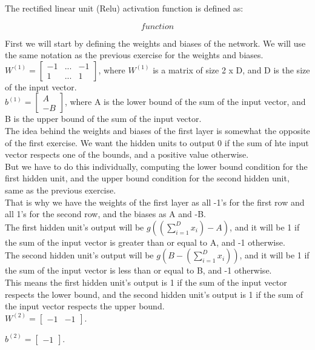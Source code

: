 \documentclass{article}
\begin{document}
The rectified linear unit (Relu) activation function is defined as:

\[ 
    function
\]

First we will start by defining the weights and biases of the network. We will use the same notation as the previous 
exercise for the weights and biases. \\

\( W^{(1)} = \begin{bmatrix}
    -1 & ...  & -1\\
    1 & ... & 1
\end{bmatrix}
\), where \(W^{(1)}\) is a matrix of size 2 x D, and D is the size of the input vector. \\

\(b^{(1)} = \begin{bmatrix}
    A\\
    -B
\end{bmatrix}
\), where A is the lower bound of the sum of the input vector, and B is the upper bound of the sum of the input vector. \\

The idea behind the weights and biases of the first layer is somewhat the opposite of the first exercise. We want the hidden units to output 0
if the sum of hte input vector respects one of the bounds, and a positive value otherwise.\\

But we have to do this individually, computing the lower bound condition for the first hidden unit, 
and the upper bound condition for the second hidden unit, same as the previous exercise. \\

That is why we have the weights of the first layer as all -1's for the first row and all 1's for the second row, and the biases as A and -B. \\
The first hidden unit's output will be $g((\sum_{i=1}^{D} x_i) - A)$, and it will be 1 if the sum of the input vector is greater than or equal to A, 
and -1 otherwise. \\
The second hidden unit's output will be $g(B - (\sum_{i=1}^{D} x_i))$, and it will be 1 if the sum of the input vector is less than or equal to B, 
and -1 otherwise. \\
This means the first hidden unit's output is 1 if the sum of the input vector respects the lower bound, 
and the second hidden unit's output is 1 if the sum of the input vector respects the upper bound. \\

\( W^{(2)} = \begin{bmatrix}
    -1 & -1
\end{bmatrix}
\).

\(b^{(2)} = \begin{bmatrix}
    -1
\end{bmatrix}
\).
\end{document}
